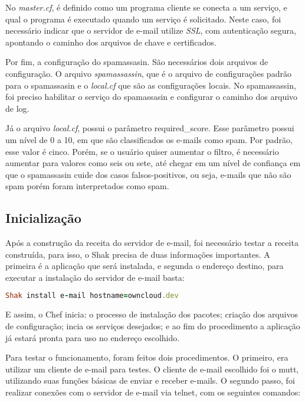No \textit{master.cf}, é definido como um programa cliente se conecta a um serviço, e qual o
programa é executado quando um serviço é solicitado. Neste caso, foi necessário
indicar que o servidor de e-mail utilize \textit{SSL}, com autenticação segura, 
apontando o caminho dos arquivos de chave e certificados.

Por fim, a configuração do spamassasin. São necessários dois arquivos de configuração.
O arquivo \textit{spamassassin}, que é o arquivo de configurações padrão para o spamassasin e o
\textit{local.cf} que são as configurações locais. No spamassassin, foi preciso habilitar 
o serviço do spamassasin e configurar o caminho dos arquivo de log.

Já o arquivo \textit{local.cf}, possui o parâmetro required\_score. Esse parâmetro 
possui um nível de 0 a 10, em que 
são classificados os e-mails como spam. Por padrão, esse valor é cinco. Porém, se 
o usuário quiser aumentar o filtro, é necessário aumentar para valores como seis ou sete, 
até chegar em um nível de confiança em que o spamassasin cuide dos casos falsos-positivos, 
ou seja, e-mails que não são spam porém foram interpretados como spam.

\subsection{Inicialização}

Após a construção da receita do servidor de e-mail, foi necessário testar a receita construída,
para isso, o Shak precisa de duas informações importantes. A primeira é a aplicação
que será instalada, e segunda o endereço destino, para executar a instalação
do servidor de e-mail basta:

\begin{lstlisting}[language=Ruby,label=dice_index,caption={Exemplo de execução de instalação do servidor de e-mailcom shak}]
Shak install e-mail hostname=owncloud.dev
\end{lstlisting}


E assim, o Chef inicia: o processo de instalação dos pacotes; criação dos arquivos
de configuração; incia os serviços desejados; e ao fim do procedimento a aplicação
já estará pronta para uso no endereço escolhido.

Para testar o funcionamento, foram feitos dois procedimentos. O primeiro, era utilizar
um cliente de e-mail para testes. O cliente de e-mail escolhido foi o mutt, utilizando
suas funções básicas de enviar e receber e-mails. O segundo passo, foi realizar conexões
com o servidor de e-mail via telnet, com os seguintes comandos:

